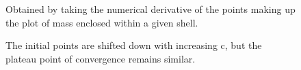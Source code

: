 \documentclass[twocolumn,11pt]{article}
\begin{document}
\begin{figure}[!h]
	\centering
	\noindent
      \caption{Obtained by taking the numerical derivative of the points making up the plot of mass enclosed within a given shell.}
\end{figure}
\begin{figure}[!h]
	\centering
	\noindent
      \caption{The initial points are shifted down with increasing c, but the plateau point of convergence remains similar.}
\end{figure}
\end{document}
